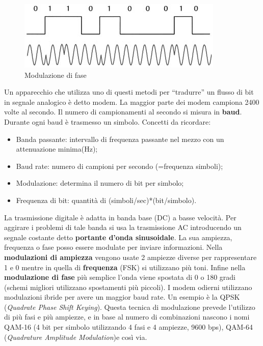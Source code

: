 \begin{figure}[htbp]
\centering
\includegraphics[scale=1]{images/modulazione_psk.jpg}
\caption{Modulazione di fase}
\end{figure}

Un apparecchio che utilizza uno di questi metodi per ``tradurre'' un flusso di bit in segnale analogico è detto modem. La maggior parte dei modem campiona 2400 volte al secondo. Il numero di campionamenti al secondo si misura in \textbf{baud}. Durante ogni baud è trasmesso un simbolo.
Concetti da ricordare:

\begin{itemize}
\item{Banda passante: intervallo di frequenza passante nel mezzo con un attenuazione minima(Hz)};
\item{Baud rate: numero di campioni per secondo (=frequenza simboli)};
\item{Modulazione: determina il numero di bit per simbolo};
\item{Frequenza di bit: quantità di (simboli/sec)*(bit/simbolo)}.

\end{itemize}

La trasmissione digitale è adatta in banda base (DC) a basse velocità. Per aggirare i problemi di tale banda si usa la trasmissione AC introducendo un segnale costante detto \textbf{portante d'onda sinusoidale}. La sua ampiezza, frequenza o fase posso essere modulate per inviare informazioni. Nella \textbf{modulazioni di ampiezza} vengono usate 2 ampiezze diverse per rappresentare 1 e 0 mentre in quella di \textbf{frequenza} (FSK) si utilizzano più toni. Infine nella \textbf{modulazione di fase} più semplice l'onda viene spostata di 0 o 180 gradi (schemi migliori utilizzano spostamenti più piccoli). I modem odierni utilizzano modulazioni ibride per avere un maggior baud rate. Un esempio è la QPSK (\textit{Quadrate Phase Shift Keying}). Questa tecnica di modulazione prevede l'utilizzo di più fasi e più ampiezze, e in base al numero di combinazioni nascono i nomi QAM-16 (4 bit per simbolo utilizzando 4 fasi e 4 ampiezze, 9600 bps), QAM-64 (\textit{Quadrature Amplitude Modulation})e così via.

